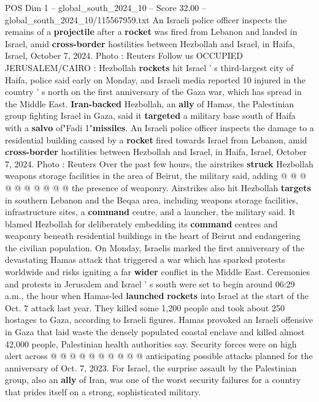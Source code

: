 \begin{textsample}{POS Dim 1 – global\_south\_2024\_10 – Score 32.00 – global\_south\_2024\_10/115567959.txt}  \label{ex:f1_pos_024}
An Israeli police officer inspects the remains of a \textbf{projectile} after a \textbf{rocket} was fired from Lebanon and landed in Israel, amid \textbf{cross-border} hostilities between Hezbollah and Israel, in Haifa, Israel, October 7, 2024.
Photo : Reuters Follow us OCCUPIED JERUSALEM/CAIRO : Hezbollah \textbf{rockets} hit Israel ' s third-largest city of Haifa, police said early on Monday, and Israeli media reported 10 injured in the country ' s north on the first anniversary of the Gaza war, which has spread in the Middle East. \textbf{Iran-backed} Hezbollah, an \textbf{ally} of Hamas, the Palestinian group fighting Israel in Gaza, said it \textbf{targeted} a military base south of Haifa with a \textbf{salvo} of"Fadi 1"\textbf{missiles}.
An Israeli police officer inspects the damage to a residential building caused by a \textbf{rocket} fired towards Israel from Lebanon, amid \textbf{cross-border} hostilities between Hezbollah and Israel, in Haifa, Israel, October 7, 2024.
Photo : Reuters Over the past few hours, the airstrikes \textbf{struck} Hezbollah weapons storage facilities in the area of Beirut, the military said, adding @ @ @ @ @ @ @ @ @ @ the presence of weaponry.
Airstrikes also hit Hezbollah \textbf{targets} in southern Lebanon and the Beqaa area, including weapons storage facilities, infrastructure sites, a \textbf{command} centre, and a launcher, the military said.
It blamed Hezbollah for deliberately embedding its \textbf{command} centres and weaponry beneath residential buildings in the heart of Beirut and endangering the civilian population.
On Monday, Israelis marked the first anniversary of the devastating Hamas attack that triggered a war which has sparked protests worldwide and risks igniting a far \textbf{wider} conflict in the Middle East.
Ceremonies and protests in Jerusalem and Israel ' s south were set to begin around 06:29 a.m., the hour when Hamas-led \textbf{launched} \textbf{rockets} into Israel at the start of the Oct. 7 attack last year.
They killed some 1,200 people and took about 250 hostages to Gaza, according to Israeli figures.
Hamas provoked an Israeli offensive in Gaza that laid waste the densely populated coastal enclave and killed almost 42,000 people, Palestinian health authorities say.
Security forces were on high alert across @ @ @ @ @ @ @ @ @ @ anticipating possible attacks planned for the anniversary of Oct. 7, 2023.
For Israel, the surprise assault by the Palestinian group, also an \textbf{ally} of Iran, was one of the worst security failures for a country that prides itself on a strong, sophisticated military.

\end{textsample}
